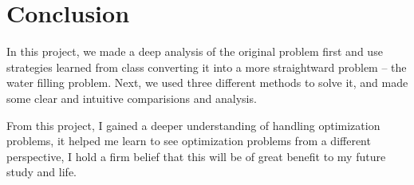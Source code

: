 \documentclass[12pt, a4paper, oneside]{article}
\begin{document}
\section{Conclusion}
In this project, we made a deep analysis of the original problem first and use strategies learned from class converting it into a more straightward problem -- the water filling problem. 
Next, we used three different methods to solve it, and made some clear and intuitive comparisions and analysis.

From this project, I gained a deeper understanding of handling optimization problems, it helped me learn to see optimization problems from a different perspective, I hold a firm belief that this will be of great benefit to my future study and life.
\end{document}
